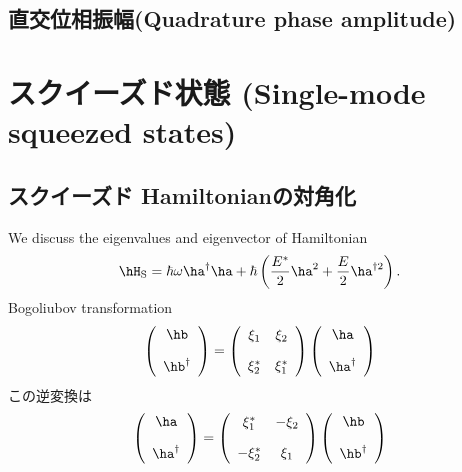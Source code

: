 
\subsection{直交位相振幅(Quadrature phase amplitude)}



\section{スクイーズド状態 (Single-mode squeezed states)}
\subsection{スクイーズド Hamiltonianの対角化}
We discuss the eigenvalues and eigenvector of Hamiltonian
\begin{equation}
    \hH_{\rm{S}}=\hbar\omega\ha^\dag\ha + \hbar \left(\frac{E^\ast}{2}\ha^{2} + \frac{E}{2}\ha^{\dag2}\right).
\end{equation}
Bogoliubov transformation
\begin{align}
    \left( 
     \begin{array}{c}
     \hb\\[10pt]
     \hb^\dag
     \end{array}
    \right)
    =
    \left( 
     \begin{array}{cc}
     \xi_1&\xi_2 \\[10pt]
     \xi_2^{\ast}&\xi_1^{\ast}
     \end{array}
    \right)
    \left( 
     \begin{array}{c}
     \ha\\[10pt]
     \ha^\dag
     \end{array}
    \right)
\end{align}
この逆変換は
\begin{align}
    \left( 
     \begin{array}{c}
     \ha\\[10pt]
     \ha^\dag
     \end{array}
    \right)
    =
    \left( 
     \begin{array}{cc}
     \xi_1^{\ast}&-\xi_2 \\[10pt]
     -\xi_2^{\ast}&\xi_1
     \end{array}
    \right)
    \left( 
     \begin{array}{c}
     \hb\\[10pt]
     \hb^\dag
     \end{array}
    \right)
\end{align}

